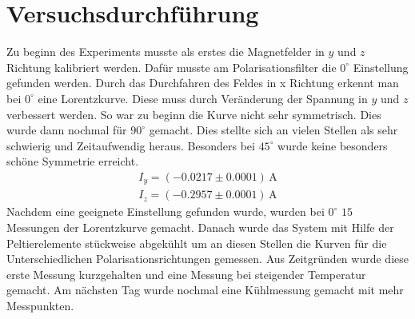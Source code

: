 \section{Versuchsdurchführung}
Zu beginn des Experiments musste als erstes die Magnetfelder in $y$ und $z$ Richtung kalibriert werden. Dafür musste am Polarisationsfilter die $0^\circ$ Einstellung gefunden werden. Durch das Durchfahren des Feldes in x Richtung erkennt man bei $0^\circ$ eine Lorentzkurve. Diese muss durch Veränderung der Spannung in $y$ und $z$ verbessert werden. So war zu beginn die Kurve nicht sehr symmetrisch. Dies wurde dann nochmal für $90^\circ$ gemacht. Dies stellte sich an vielen Stellen als sehr schwierig und Zeitaufwendig heraus. Besonders bei $45^\circ$ wurde keine besonders schöne Symmetrie erreicht.
\begin{align}
	I_y=(-0.0217\pm0.0001)\,\text{A}\\
	I_z=(-0.2957\pm0.0001)\,\text{A}
\end{align}
Nachdem eine geeignete Einstellung gefunden wurde, wurden bei $0^\circ$ $15$ Messungen der Lorentzkurve gemacht. Danach wurde das System mit Hilfe der Peltierelemente stückweise abgekühlt um an diesen Stellen die Kurven für die Unterschiedlichen Polarisationsrichtungen gemessen. Aus Zeitgründen wurde diese erste Messung kurzgehalten und eine Messung bei steigender Temperatur gemacht. Am nächsten Tag wurde nochmal eine Kühlmessung gemacht mit mehr Messpunkten.
